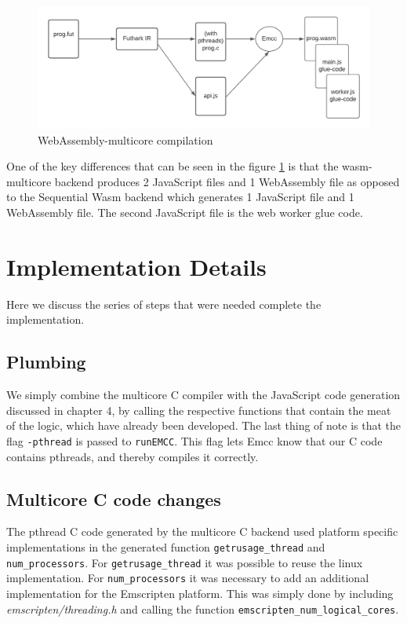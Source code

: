 \documentclass[11pt]{book}
\begin{document}
\begin{figure}[htbp]
\centerline{\includegraphics[width=\textwidth]{figures/WASM_MC_compiler.png}}
    \caption{WebAssembly-multicore compilation}
\label{fig:wasm-mc}
\end{figure}
One of the key differences that can be seen in the figure \ref{fig:wasm-mc} is that the wasm-multicore backend produces 2 JavaScript files and 1 WebAssembly file as opposed to the Sequential Wasm backend which generates 1 JavaScript file and 1 WebAssembly file. The second JavaScript file is the web worker glue code.

\section{Implementation Details}
Here we discuss the series of steps that were needed complete the implementation.
\subsection{Plumbing}

We simply combine the multicore C compiler with the JavaScript code generation discussed in chapter 4, by calling the respective functions that contain the meat of the logic, which have already been developed. The last thing of note is that the flag \texttt{-pthread} is passed to \texttt{runEMCC}. This flag lets Emcc know that our C code contains pthreads, and thereby compiles it correctly. %


\subsection{Multicore C code changes}
The pthread C code generated by the multicore C backend used platform specific implementations in the generated function \texttt{getrusage\_thread} and \texttt{num\_processors}. For \texttt{getrusage\_thread} it was possible to reuse the linux implementation. For \texttt{num\_processors} it was necessary to add an additional implementation for the Emscripten platform. This was simply done by including \textit{emscripten/threading.h} and calling the function \texttt{emscripten\_num\_logical\_cores}. %
\end{document}
